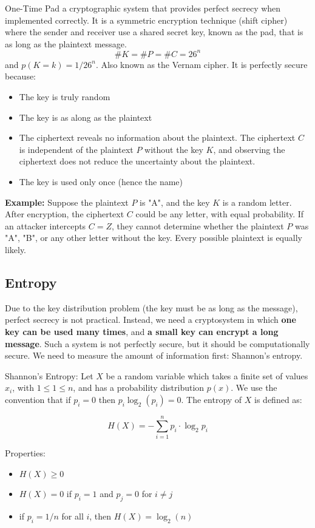 \begin{defn}
One-Time Pad a cryptographic system that provides perfect secrecy when implemented correctly. It is a symmetric encryption technique (shift cipher) where the sender and receiver use a shared secret key, known as the pad, that is as long as the plaintext message. 
\[\#K = \#P = \#C = 26^n\]
and $p(K=k) = 1/26^n$. Also known as the Vernam cipher. It is perfectly secure because:
\begin{itemize}
    \item The key is truly random
    \item The key is as along as the plaintext
    \item The ciphertext reveals no information about the plaintext. The ciphertext $C$ is independent of the plaintext $P$ without the key $K$, and observing the ciphertext does not reduce the uncertainty about the plaintext.
    \item The key is used only once (hence the name)
\end{itemize}
\end{defn}

\textbf{Example:} Suppose the plaintext \( P \) is "A", and the key \( K \) is a random letter. After encryption, the ciphertext \( C \) could be any letter, with equal probability. If an attacker intercepts \( C = Z \), they cannot determine whether the plaintext \( P \) was "A", "B", or any other letter without the key. Every possible plaintext is equally likely.

\subsection{Entropy}
Due to the key distribution problem (the key must be as long as the message), perfect secrecy is not practical. Instead, we need a cryptosystem in which \textbf{one key can be used many times}, and \textbf{a  small key can encrypt a long message}. Such a system is not perfectly secure, but it should be computationally secure. We need to measure the amount of information first: Shannon's entropy. \\

\begin{defn}
    Shannon's Entropy: Let $X$ be a random variable which takes a finite set of values $x_i$, with $1 \leq 1 \leq n$, and has a probability distribution $p(x)$. We use the convention that if $p_i = 0$ then $p_i \log_2(p_i) = 0$. The entropy of $X$ is defined as:

    \[ H(X) = -\sum_{i=1}^n p_i \cdot \log_2 p_i\] 

    Properties:
    \begin{itemize}
        \item $H(X) \geq 0$
        \item $H(X) = 0$ if $p_i = 1$ and $p_j = 0$ for $i \neq j$
        \item if $p_i = 1/n$ for all $i$, then $H(X) = \log_2(n)$
    \end{itemize}
\end{defn}

